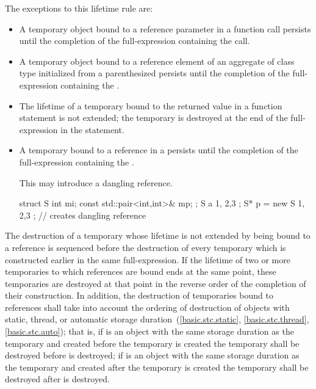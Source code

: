 The exceptions to this lifetime rule are:
\begin{itemize}
\item A temporary object bound to a reference parameter in a function call
persists until the completion of the full-expression containing the call.

\item A temporary object bound to a reference element of
an aggregate of class type initialized from
a parenthesized 
persists until the completion of the full-expression
containing the .

\item The lifetime of a temporary bound to the returned value in a function  statement is not extended; the temporary is destroyed at the end of the full-expression in the  statement.

\item A temporary bound to a reference in a  persists until the completion of the full-expression containing the .
\begin{note}
This may introduce a dangling reference.
\end{note}
\begin{example}
\begin{codeblock}
struct S { int mi; const std::pair<int,int>& mp; };
S a { 1, {2,3} };
S* p = new S{ 1, {2,3} };       // creates dangling reference
\end{codeblock}
\end{example}
\end{itemize}

\pnum
The destruction of a temporary whose lifetime is not extended by being
bound to a reference is sequenced before the destruction of every
temporary which is constructed earlier in the same full-expression.
If the lifetime of two or more temporaries to which references are bound ends
at the same point,
these temporaries are destroyed at that point in the reverse order of the
completion of their construction.
In addition, the destruction of temporaries bound to references shall
take into account the ordering of destruction of objects with static, thread, or
automatic storage duration~(\ref{basic.stc.static}, \ref{basic.stc.thread}, \ref{basic.stc.auto});
that is, if
is an object with the same storage duration as the temporary and
created before the temporary is created
the temporary shall be destroyed before
is destroyed;
if
is an object with the same storage duration as the temporary and
created after the temporary is created
the temporary shall be destroyed after
is destroyed.

